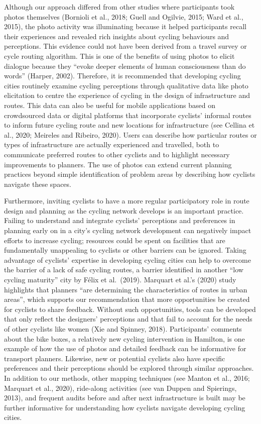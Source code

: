 \documentclass[]{elsarticle} %
\begin{document}
Although our approach differed from other studies where participants
took photos themselves (Bornioli et al., 2018; Guell and Ogilvie, 2015;
Ward et al., 2015), the photo activity was illuminating because it
helped participants recall their experiences and revealed rich insights
about cycling behaviours and perceptions. This evidence could not have
been derived from a travel survey or cycle routing algorithm. This is
one of the benefits of using photos to elicit dialogue because they
``evoke deeper elements of human consciousness than do words'' (Harper,
2002). Therefore, it is recommended that developing cycling cities
routinely examine cycling perceptions through qualitative data like
photo elicitation to centre the experience of cycling in the design of
infrastructure and routes. This data can also be useful for mobile
applications based on crowdsourced data or digital platforms that
incorporate cyclists' informal routes to inform future cycling route and
new locations for infrastructure (see Cellina et al., 2020; Meireles and
Ribeiro, 2020). Users can describe how particular routes or types of
infrastructure are actually experienced and travelled, both to
communicate preferred routes to other cyclists and to highlight
necessary improvements to planners. The use of photos can extend current
planning practices beyond simple identification of problem areas by
describing how cyclists navigate these spaces.

Furthermore, inviting cyclists to have a more regular participatory role
in route design and planning as the cycling network develops is an
important practice. Failing to understand and integrate cyclists'
perceptions and preferences in planning early on in a city's cycling
network development can negatively impact efforts to increase cycling;
resources could be spent on facilities that are fundamentally
unappealing to cyclists or other barriers can be ignored. Taking
advantage of cyclists' expertise in developing cycling cities can help
to overcome the barrier of a lack of safe cycling routes, a barrier
identified in another ``low cycling maturity'' city by Félix et
al.~(2019). Marquart et al.'s (2020) study highlights that planners
``are determining the characteristics of routes in urban areas'', which
supports our recommendation that more opportunities be created for
cyclists to share feedback. Without such opportunities, tools can be
developed that only reflect the designers' perceptions and that fail to
account for the needs of other cyclists like women (Xie and Spinney,
2018). Participants' comments about the bike boxes, a relatively new
cycling intervention in Hamilton, is one example of how the use of
photos and detailed feedback can be informative for transport planners.
Likewise, new or potential cyclists also have specific preferences and
their perceptions should be explored through similar approaches. In
addition to our methods, other mapping techniques (see Manton et al.,
2016; Marquart et al., 2020), ride-along activities (see van Duppen and
Spierings, 2013), and frequent audits before and after next
infrastructure is built may be further informative for understanding how
cyclists navigate developing cycling cities.
\end{document}
